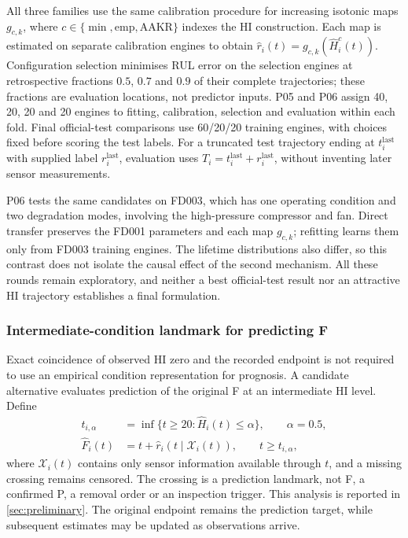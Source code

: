 \documentclass[preprint,12pt]{elsarticle}
\begin{document}
All three families use the same calibration procedure for increasing isotonic maps $g_{c,k}$, where $c\in\{\min,\mathrm{emp},\mathrm{AAKR}\}$ indexes the HI construction. Each map is estimated on separate calibration engines to obtain $\widehat r_i(t)=g_{c,k}(\widehat H_i^c(t))$. Configuration selection minimises RUL error on the selection engines at retrospective fractions $0.5$, $0.7$ and $0.9$ of their complete trajectories; these fractions are evaluation locations, not predictor inputs. P05 and P06 assign 40, 20, 20 and 20 engines to fitting, calibration, selection and evaluation within each fold. Final official-test comparisons use 60/20/20 training engines, with choices fixed before scoring the test labels. For a truncated test trajectory ending at $t_i^{\mathrm{last}}$ with supplied label $r_i^{\mathrm{last}}$, evaluation uses $T_i=t_i^{\mathrm{last}}+r_i^{\mathrm{last}}$, without inventing later sensor measurements.

P06 tests the same candidates on FD003, which has one operating condition and two degradation modes, involving the high-pressure compressor and fan. Direct transfer preserves the FD001 parameters and each map $g_{c,k}$; refitting learns them only from FD003 training engines. The lifetime distributions also differ, so this contrast does not isolate the causal effect of the second mechanism. All these rounds remain exploratory, and neither a best official-test result nor an attractive HI trajectory establishes a final formulation.

\subsubsection{Intermediate-condition landmark for predicting F}\label{sec:landmark}

Exact coincidence of observed HI zero and the recorded endpoint is not required to use an empirical condition representation for prognosis. A candidate alternative evaluates prediction of the original F at an intermediate HI level. Define
\[
\begin{aligned}
t_{i,\alpha}&=\inf\{t\geq20:\widehat H_i(t)\leq\alpha\},
\qquad \alpha=0.5,\\
\widehat F_i(t)&=t+\widehat r_i(t\mid\mathcal X_i(t)),
\qquad t\geq t_{i,\alpha},
\end{aligned}
\]
where $\mathcal X_i(t)$ contains only sensor information available through $t$, and a missing crossing remains censored. The crossing is a prediction landmark, not F, a confirmed P, a removal order or an inspection trigger. This analysis is reported in \cref{sec:preliminary}. The original endpoint remains the prediction target, while subsequent estimates may be updated as observations arrive.
\end{document}
